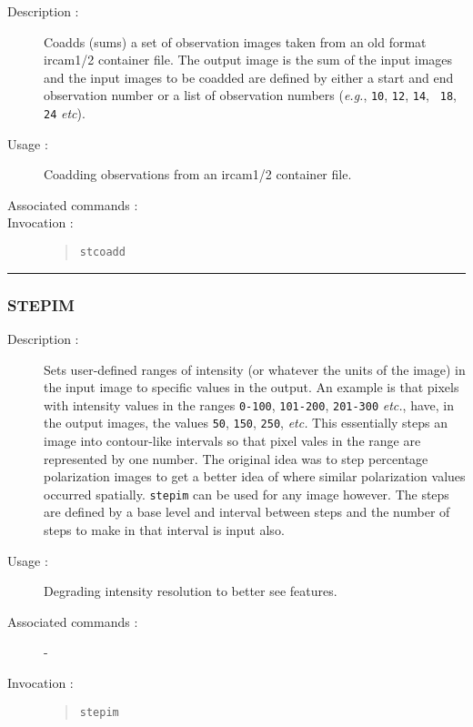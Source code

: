 \begin{description}

\item[Description :] Coadds (sums) a set of observation images taken
from an old format {\sc ircam1/2} container file.  The output image is
the sum of the input images and the input images to be coadded are
defined by either a start and end observation number or a list of
observation numbers (\emph{e.g.}, {\tt 10}, {\tt 12}, {\tt 14}, {\tt
18}, {\tt 24} \emph{etc}).

\item[Usage :] Coadding observations from an {\sc ircam1/2} container file.
\item[Associated commands :] {\tt {}}
\item[Invocation :]

\begin{quote}{\tt  stcoadd }\end{quote}

\end{description}

\hrule 
\subsubsection*{\label{STEPIM}STEPIM}

\begin{description}

\item[Description :] Sets user-defined ranges of intensity (or whatever
the units of the image) in the input image to specific values in the
output.  An example is that pixels with intensity values in the ranges
{\tt 0-100}, {\tt 101-200}, {\tt 201-300} \emph{etc.}, have, in the
output images, the values {\tt 50}, {\tt 150}, {\tt 250}, \emph{etc.}
This essentially steps an image into contour-like intervals so that
pixel vales in the range are represented by one number.  The original
idea was to step percentage polarization images to get a better idea of
where similar polarization values occurred spatially.  {\tt stepim} can be
used for any image however.  The steps are defined by a base level and
interval between steps and the number of steps to make in that interval
is input also.

\item[Usage :] Degrading intensity resolution to better see features.
\item[Associated commands :] -
\item[Invocation :]

\begin{quote}{\tt  stepim }\end{quote}

\end{description}

